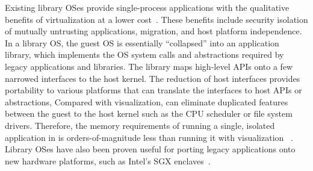 
Existing library OSes provide single-process applications
with the qualitative benefits of virtualization
at a lower cost~\citep{porter11drawbridge,unikernels,baumann13bascule}.
These benefits include security isolation of mutually untrusting applications,
migration, and host platform independence.
In a library OS, the guest OS is essentially ``collapsed''
into an application library,
which implements the OS system calls and abstractions required by legacy applications
and libraries.
The library maps high-level APIs onto a few narrowed interfaces
to the host kernel.
The reduction of host interfaces provides portability to various platforms that can translate the interfaces to host APIs or abstractions,
Compared with visualization, 
\liboses{} can eliminate duplicated features between the guest to the host kernel
such as the CPU scheduler or file system drivers.
Therefore, 
the memory requirements of running a single, isolated application in \liboses{}
is  orders-of-magnitude
less than running it with visualization
~\citep{porter11drawbridge,unikernels}.
Library OSes have also been proven
useful for porting legacy applications
onto new hardware platforms, such as Intel's SGX enclaves~\citep{baumann14haven}.


